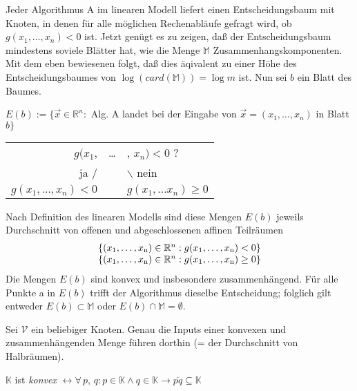 \begin{beweis}
Jeder Algorithmus A im linearen Modell liefert einen Entscheidungsbaum mit Knoten, in denen für alle möglichen Rechenabläufe
gefragt wird, ob \( g( x_1, \dots , x_n) < 0 \)  ist. Jetzt genügt es zu zeigen, daß der Entscheidungsbaum mindestens soviele
Blätter hat, wie die Menge \( \mathbb{M}  \) Zusammenhangskomponenten. Mit dem eben bewiesenen folgt, daß dies äqivalent zu einer Höhe
des Entscheidungsbaumes von \(\log (card(\mathbb{M}))=\log m\) ist. Nun sei $b$ ein Blatt des Baumes.

  \begin{definition}
  \(E(b) := \lbrace \vec x \in \mathbb{R}^n : \) Alg. A landet bei der Eingabe von \( \vec x = (x_1, \dots ,x_n) \) in Blatt \( b \rbrace \)
  \end{definition}
		
  \begin{tabular}{rcl}
  \( g(x_1\), & \dots & , \( x_n) < 0 \) ? \\
  ja / & & \( \backslash \) nein\\
  \( g(x_1, \dots, x_n) < 0 \) & & \( g(x_1, \dots x_n) \geq 0 \)
  \end{tabular}
\bigskip
  
Nach Definition des linearen Modells sind diese Mengen $E(b)$ jeweils Durchschnitt von offenen und abgeschlossenen affinen Teilräumen
\begin{gather*}
  \begin{array}{c}
  \{(x_1,\ldots,x_{\textup{n}}) \in \mathbb{R}^n : g(x_1,\ldots,x_{\textup{n}})<0\}\\
  \{(x_1,\ldots,x_{\textup{n}}) \in \mathbb{R}^n : g(x_1,\ldots,x_{\textup{n}})\geq0\}
  \end{array}
\end{gather*}
Die Mengen $E(b)$ sind konvex und insbesondere zusammenhängend. Für alle Punkte a in $E(b)$ trifft der Algorithmus dieselbe
Entscheidung; folglich gilt entweder \(E(b) \subset \mathbb{M}\) oder \(E(b) \cap \mathbb{M}=\emptyset\). 

Sei $\mathcal{V}$ ein beliebiger Knoten.
Genau die Inputs einer konvexen und zusammenhängenden Menge führen dorthin (= der Durchschnitt von Halbräumen).	
  
  \begin{definition}	
  \( \mathbb{K} \) ist \textit{konvex}
  \(\leftrightarrow  \forall \, p, \, q: p\in \mathbb{K} \wedge q \in \mathbb{K}
  \rightarrow  \overline{pq} \subseteq \mathbb{K}\)
  \end{definition}
  

\end{beweis}
